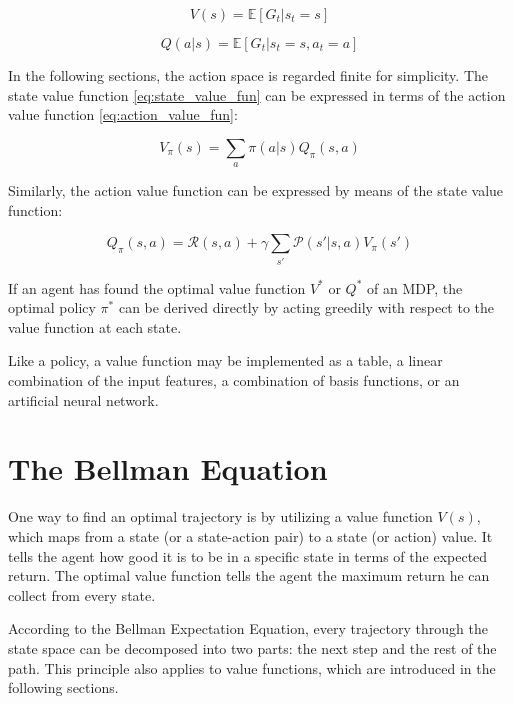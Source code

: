 \begin{equation}
V(s) = \mathbb{E}[G_t|s_t=s]
\label{eq:state_value_fun}
\end{equation}

\begin{equation}
Q(a|s) = \mathbb{E}[G_t|s_t=s,a_t=a]
\label{eq:action_value_fun}
\end{equation}

In the following sections, the action space is regarded finite for simplicity.
The state value function \ref{eq:state_value_fun} can be expressed in terms of the action value function \ref{eq:action_value_fun}:

\begin{equation}
V_\pi(s) = \sum_{a}\pi(a|s)Q_\pi(s,a)
\label{eq:state_value_function_with_q}
\end{equation}

Similarly, the action value function can be expressed by means of the state value function:

\begin{equation}
Q_\pi(s,a)=\mathcal{R}(s,a)+\gamma \sum_{s'}\mathcal{P}(s'|s,a)V_\pi(s')
\label{eq:action_value_function_with_v}
\end{equation}

If an agent has found the optimal value function $V^*$ or $Q^*$ of an MDP, the optimal policy $\pi^*$ can be derived directly by acting greedily with respect to the value function at each state.

Like a policy, a value function may be implemented as a table, a linear combination of the input features, a combination of basis functions, or an artificial neural network.

\section{The Bellman Equation}
\label{sec:Bellman_Equation}
One way to find an optimal trajectory is by utilizing a value function $V(s)$, which maps from a state (or a state-action pair) to a state (or action) value. It tells the agent how good it is to be in a specific state in terms of the expected return. The optimal value function tells the agent the maximum return he can collect from every state.

According to the Bellman Expectation Equation, every trajectory through the state space can be decomposed into two parts: the next step and the rest of the path. This principle also applies to value functions, which are introduced in the following sections.

